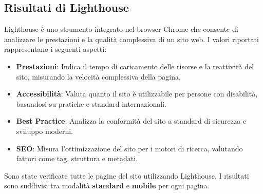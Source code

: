 \subsection{Risultati di Lighthouse}
Lighthouse è uno strumento integrato nel browser Chrome che consente di analizzare le prestazioni e la qualità complessiva di un sito web. I valori riportati rappresentano i seguenti aspetti:  
\begin{itemize}
    \item \textbf{Prestazioni}: Indica il tempo di caricamento delle risorse e la reattività del sito, misurando la velocità complessiva della pagina.
    \item \textbf{Accessibilità}: Valuta quanto il sito è utilizzabile per persone con disabilità, basandosi su pratiche e standard internazionali.
    \item \textbf{Best Practice}: Analizza la conformità del sito a standard di sicurezza e sviluppo moderni.
    \item \textbf{SEO}: Misura l'ottimizzazione del sito per i motori di ricerca, valutando fattori come tag, struttura e metadati.
\end{itemize}

Sono state verificate tutte le pagine del sito utilizzando Lighthouse. I risultati sono suddivisi tra modalità \textbf{standard} e \textbf{mobile} per ogni pagina.

